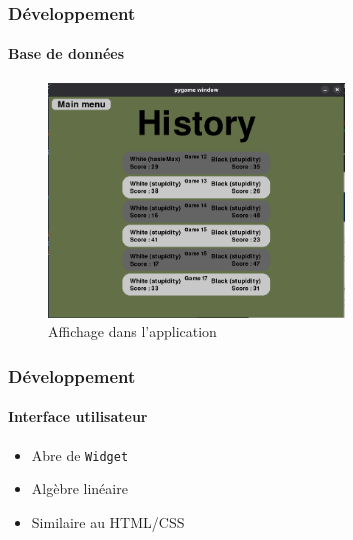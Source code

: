 \begin{frame}
	\frametitle{Développement}
	\framesubtitle{Base de données}
	\begin{figure}
		\includegraphics[width=0.7\textwidth]{img/history.png}
		\caption{Affichage dans l'application}
	\end{figure}
\end{frame}

\begin{frame}
	\frametitle{Développement}
	\framesubtitle{Interface utilisateur}

	\begin{itemize}
		\item Abre de \lstinline{Widget}
		\item Algèbre linéaire
		\item Similaire au HTML/CSS
	\end{itemize}
\end{frame}

